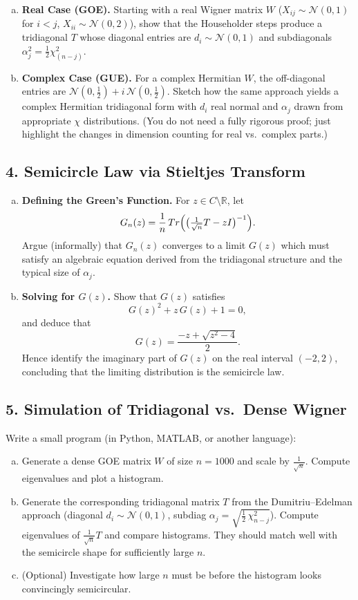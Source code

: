 \documentclass[letterpaper,11pt,oneside,reqno]{article}
\numberwithin{equation}{section}
\theoremstyle{definition}
\begin{document}
\begin{enumerate}[(a)]
\item {\bf Real Case (GOE).} Starting with a real Wigner matrix $W$ ($X_{ij}\sim \mathcal{N}(0,1)$ for $i<j$, $X_{ii}\sim \mathcal{N}(0,2)$), show that the Householder steps produce a tridiagonal $T$ whose diagonal entries are $d_i\sim \mathcal{N}(0,1)$ and subdiagonals $\alpha_j^2 = \frac12 \chi^2_{(n-j)}$.
\item {\bf Complex Case (GUE).} For a complex Hermitian $W$, the off-diagonal entries are $\mathcal{N}(0,\tfrac12)+ i\,\mathcal{N}(0,\tfrac12)$. Sketch how the same approach yields a complex Hermitian tridiagonal form with $d_i$ real normal and $\alpha_j$ drawn from appropriate $\chi$ distributions. (You do not need a fully rigorous proof; just highlight the changes in dimension counting for real vs.\ complex parts.)
\end{enumerate}

\subsection*{4. Semicircle Law via Stieltjes Transform}

\begin{enumerate}[(a)]
\item {\bf Defining the Green’s Function.} For $z\in C\setminus\mathbb{R}$, let
\[
  G_n(z) = \frac{1}{n} \,Tr\Bigl(\bigl(\tfrac1{\sqrt{n}} T - z I\bigr)^{-1}\Bigr).
\]
Argue (informally) that $G_n(z)$ converges to a limit $G(z)$ which must satisfy an algebraic equation derived from the tridiagonal structure and the typical size of $\alpha_j$.
\item {\bf Solving for $G(z)$.} Show that $G(z)$ satisfies
\[
  G(z)^2 + z\,G(z) + 1 = 0,
\]
and deduce that
\[
  G(z) = \frac{-z + \sqrt{z^2-4}}{2}.
\]
Hence identify the imaginary part of $G(z)$ on the real interval $(-2,2)$, concluding that the limiting distribution is the semicircle law.
\end{enumerate}

\subsection*{5. Simulation of Tridiagonal vs.\ Dense Wigner}

Write a small program (in Python, MATLAB, or another language):
\begin{enumerate}[(a)]
\item Generate a dense GOE matrix $W$ of size $n=1000$ and scale by $\frac{1}{\sqrt{n}}$. Compute eigenvalues and plot a histogram.
\item Generate the corresponding tridiagonal matrix $T$ from the Dumitriu--Edelman approach (diagonal $d_i\sim \mathcal{N}(0,1)$, subdiag $\alpha_j= \sqrt{\tfrac12\,\chi^2_{n-j}}$). Compute eigenvalues of $\frac{1}{\sqrt{n}}T$ and compare histograms. They should match well with the semicircle shape for sufficiently large $n$.
\item (Optional) Investigate how large $n$ must be before the histogram looks convincingly semicircular.
\end{enumerate}
\end{document}

